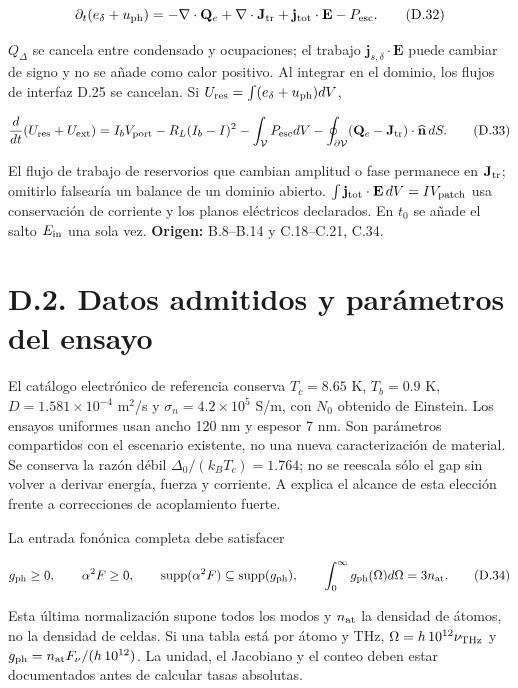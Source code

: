 \documentclass[
  spanish,
  10pt,
  a4paper,
]{article}
\begin{document}
\[
\partial_t(e_\delta+u_{\rm ph})
=-\nabla\cdot\mathbf Q_e+\nabla\cdot\mathbf J_{\rm tr}
+\mathbf j_{\rm tot}\cdot\mathbf E-P_{\rm esc}.
\tag{D.32}
\]

\(Q_\Delta\) se cancela entre condensado y ocupaciones; el trabajo
\(\mathbf j_{s,\delta}\cdot\mathbf E\) puede cambiar de signo y no se
añade como calor positivo. Al integrar en el dominio, los flujos de
interfaz D.25 se cancelan. Si
\(U_{\rm res}=\int(e_\delta+u_{\rm ph})dV\),

\[
\frac{d}{dt}(U_{\rm res}+U_{\rm ext})
=I_bV_{\rm port}-R_L(I_b-I)^2
-\int_{\mathcal V}P_{\rm esc}dV
-\oint_{\partial\mathcal V}(\mathbf Q_e-\mathbf J_{\rm tr})\cdot\widehat{\mathbf n}\,dS.
\tag{D.33}
\]

El flujo de trabajo de reservorios que cambian amplitud o fase permanece
en \(\mathbf J_{\rm tr}\); omitirlo falsearía un balance de un dominio
abierto. \(\int\mathbf j_{\rm tot}\cdot\mathbf E\,dV=I V_{\rm patch}\)
usa conservación de corriente y los planos eléctricos declarados. En
\(t_0\) se añade el salto \(E_{\rm in}\) una sola vez. \textbf{Origen:}
B.8--B.14 y C.18--C.21, C.34.

\section{D.2. Datos admitidos y parámetros del
ensayo}\label{d.2.-datos-admitidos-y-paruxe1metros-del-ensayo}

El catálogo electrónico de referencia conserva \(T_c=8.65\) K,
\(T_b=0.9\) K, \(D=1.581\times10^{-4}\) m\(^2\)/s y
\(\sigma_n=4.2\times10^5\) S/m, con \(N_0\) obtenido de Einstein. Los
ensayos uniformes usan ancho 120 nm y espesor 7 nm. Son parámetros
compartidos con el escenario existente, no una nueva caracterización de
material. Se conserva la razón débil \(\Delta_0/(k_BT_c)=1.764\); no se
reescala sólo el gap sin volver a derivar energía, fuerza y corriente. A
explica el alcance de esta elección frente a correcciones de
acoplamiento fuerte.

La entrada fonónica completa debe satisfacer

\[
g_{\rm ph}\geq0,\qquad \alpha^2F\geq0,\qquad
\operatorname{supp}(\alpha^2F)\subseteq\operatorname{supp}(g_{\rm ph}),\qquad
\int_0^\infty g_{\rm ph}(\Omega)d\Omega=3n_{\rm at}.
\tag{D.34}
\]

Esta última normalización supone todos los modos y \(n_{\rm at}\) la
densidad de átomos, no la densidad de celdas. Si una tabla está por
átomo y THz, \(\Omega=h\,10^{12}\nu_{\rm THz}\) y
\(g_{\rm ph}=n_{\rm at}F_\nu/(h\,10^{12})\). La unidad, el Jacobiano y
el conteo deben estar documentados antes de calcular tasas absolutas.
\end{document}
